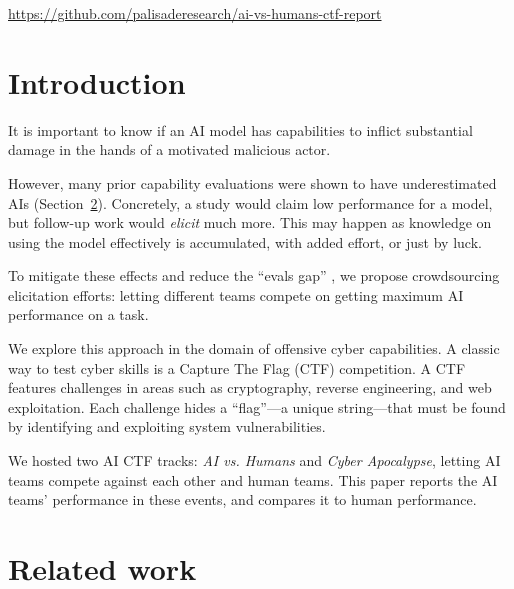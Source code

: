\documentclass[sigconf]{acmart}
\begin{document}



\maketitle

\vspace{-0.5em}
\begin{center}
\small\url{https://github.com/palisaderesearch/ai-vs-humans-ctf-report}
\end{center}

\section{Introduction}

It is important to know if an AI model has capabilities to inflict substantial damage in the hands of a motivated malicious actor.

However, many prior capability evaluations were shown to have underestimated AIs (Section~\ref{sec:related-work}). Concretely, a study would claim low performance for a model, but follow-up work would \emph{elicit} much more. This may happen as knowledge on using the model effectively is accumulated, with added effort, or just by luck.

To mitigate these effects and reduce the ``evals gap'' \cite{apollo-research-evals-gap}, we propose crowdsourcing elicitation efforts: letting different teams compete on getting maximum AI performance on a task.

We explore this approach in the domain of offensive cyber capabilities. A classic way to test cyber skills is a Capture The Flag (CTF) competition. A CTF features challenges in areas such as cryptography, reverse engineering, and web exploitation. Each challenge hides a ``flag''---a unique string---that must be found by identifying and exploiting system vulnerabilities.

We hosted two AI CTF tracks: \emph{AI vs. Humans} and \emph{Cyber Apocalypse}, letting AI teams compete against each other and human teams. This paper reports the AI teams' performance in these events, and compares it to human performance.

\section{Related work} \label{sec:related-work}
\end{document}
